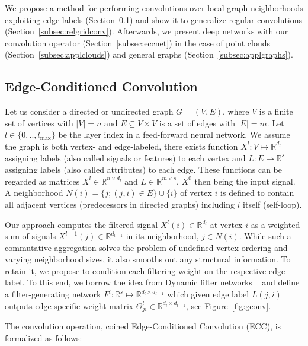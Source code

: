 \documentclass[10pt,twocolumn,letterpaper]{article}
\begin{document}
We propose a method for performing convolutions over local graph neighborhoods exploiting edge labels (Section~\ref{subsec:ecc}) and show it to generalize regular convolutions (Section~\ref{subsec:relgridconv}). Afterwards, we present deep networks with our convolution operator (Section~\ref{subsec:eccnet}) in the case of point clouds (Section~\ref{subsec:applclouds}) and general graphs (Section~\ref{subsec:applgraphs}).






\subsection{Edge-Conditioned Convolution} \label{subsec:ecc}

Let us consider a directed or undirected graph $G=(V,E)$, where $V$ is a finite set of vertices with $|V|=n$ and $E\subseteq V\times V$ is a set of edges with $|E|=m$. Let $l\in\{0,..,l_\mathrm{max}\}$ be the layer index in a feed-forward neural network. We assume the graph is both vertex- and edge-labeled, \ie there exists function $X^l:V \mapsto\mathbb{R}^{d_l}$ assigning labels (also called signals or features) to each vertex and $L: E\mapsto\mathbb{R}^s$ assigning labels (also called attributes) to each edge. These functions can be regarded as matrices $X^l\in\mathbb{R}^{n\times d_l}$ and $L\in\mathbb{R}^{m\times s}$, $X^0$ then being the input signal. A neighborhood $N(i)=\{j;(j,i)\in E\}\cup\{i\}$ of vertex $i$ is defined to contain all adjacent vertices (predecessors in directed graphs) including $i$ itself (self-loop).

\def\dimo{{\mathbb{R}^{d_l}}}
\def\dimi{{\mathbb{R}^{d_{l-1}}}}
\def\dimjoint{{\mathbb{R}^{d_l\times d_{l-1}}}}

Our approach computes the filtered signal $X^l(i)\in\dimo$ at vertex $i$ as a weighted sum of signals $X^{l-1}(j)\in\dimi$ in its neighborhood, $j\in N(i)$. While such a commutative aggregation solves the problem of undefined vertex ordering and varying neighborhood sizes, it also smooths out any structural information. To retain it, we propose to condition each filtering weight on the respective edge label. To this end, we borrow the idea from Dynamic filter networks ~\cite{dfn16} and define a filter-generating network $F^l: \mathbb{R}^{s} \mapsto \dimjoint$  which given edge label $L(j,i)$ outputs edge-specific weight matrix $\Theta_{ji}^l \in\dimjoint$, see Figure~\ref{fig:gconv}. 

The convolution operation, coined Edge-Conditioned Convolution (ECC), is formalized as follows:
\end{document}
